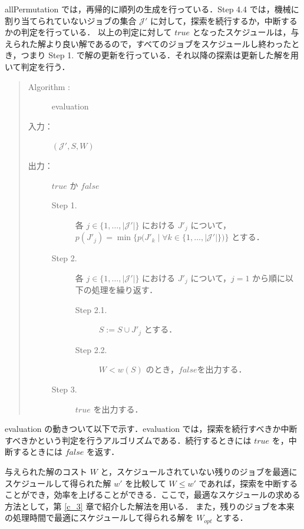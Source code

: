 \documentclass[12pt]{optlab-bachelor}
\begin{document}
{\sc allPermutation} では，再帰的に順列の生成を行っている．Step 4.4 では，機械に割り当てられていないジョブの集合 $\mathcal{J}'$ に対して，探索を続行するか，中断するかの判定を行っている．
以上の判定に対して $true$ となったスケジュールは，与えられた解より良い解であるので，すべてのジョブをスケジュールし終わったとき，つまり Step 1. で解の更新を行っている．それ以降の探索は更新した解を用いて判定を行う．

\begin{quote}
  \begin{description}
    \item[{\sc Algorithm : }] {\sc evaluation}
    \item[入力：] $(\mathcal{J}', S, W)$
    \item[出力：] $true$ か $false$
    \begin{description}
      \item[Step 1.] 各 $j \in \{1,\ldots,|\mathcal{J}'|\}$ における $J'_j$ について，\\$p(J'_j) = \min\bigg\{p\big(J'_k \mid \forall k \in \{1,\ldots,|\mathcal{J}'|\}\big)\bigg\}$ とする．
      \item[Step 2.] 各 $j \in \{1,\ldots,|\mathcal{J}'|\}$ における $J'_j$ について，$j = 1$ から順に以下の処理を繰り返す．
      \begin{description}
        \item[Step 2.1.] $S := S \cup J'_j$ とする．
        \item[Step 2.2.] $W < w(S)$ のとき，$false$を出力する．
      \end{description}
      \item[Step 3.] $true$ を出力する．
    \end{description}
  \end{description}
\end{quote}

{\sc evaluation} の動きついて以下で示す．{\sc evaluation} では，探索を続行すべきか中断すべきかという判定を行うアルゴリズムである．続行するときには $true$ を，中断するときには $false$ を返す．

与えられた解のコスト $W$ と，スケジュールされていない残りのジョブを最適にスケジュールして得られた解 $w'$ を比較して $W \le w'$ であれば，探索を中断することができ，効率を上げることができる．ここで，最適なスケジュールの求める方法として，第 \ref{c_3} 章で紹介した解法を用いる．
また，残りのジョブを本来の処理時間で最適にスケジュールして得られる解を $W_{opt}$ とする．
\end{document}
